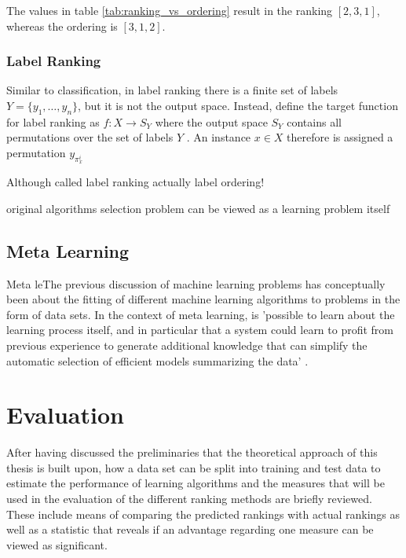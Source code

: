 The values in table \ref{tab:ranking_vs_ordering} result in the ranking $[2,3,1]$, whereas the ordering is $[3,1,2]$.

\subsubsection{Label Ranking}
Similar to classification, in label ranking there is a finite set of labels $Y=\lbrace y_1,\dots,y_n \rbrace$, but it is not the output space. Instead, \citeauthor{DBLP:books/daglib/0025729} define the target function for label ranking as $f:X\rightarrow S_Y$ where the output space $S_Y$ contains all permutations over the set of labels $Y$ \cite{DBLP:books/daglib/0025729}. An instance $x \in X$ therefore is assigned a permutation $y_{\pi_x^i}$

Although called label ranking actually label ordering!

original algorithms selection problem \cite{rice1976algorithm} can be viewed as a learning problem itself

\subsection{Meta Learning}
Meta leThe previous discussion of machine learning problems has conceptually been about the fitting of different machine learning algorithms to problems in the form of data sets. In the context of meta learning, is 'possible to learn about the learning process
itself, and in particular that a system could learn to profit from previous
experience to generate additional knowledge that can simplify the automatic
selection of efficient models summarizing the data' \cite{razdil2008metalearning}.


\section{Evaluation}

After having discussed the preliminaries that the theoretical approach of this thesis is built upon, how a data set can be split into training and test data to estimate the performance of learning algorithms and the measures that will be used in the evaluation of the different ranking methods are briefly reviewed. These include means of comparing the predicted rankings with actual rankings as well as a statistic that reveals if an advantage regarding one measure can be viewed as significant.

